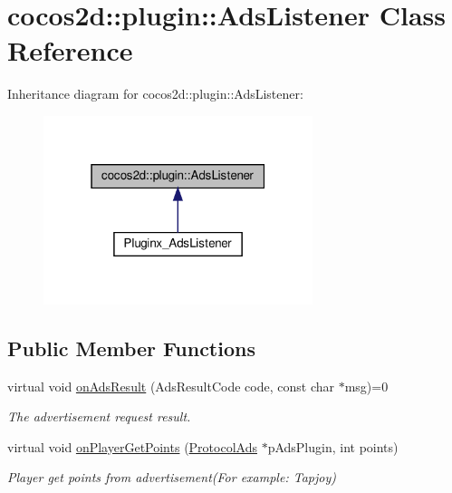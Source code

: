 \hypertarget{classcocos2d_1_1plugin_1_1AdsListener}{}\section{cocos2d\+:\+:plugin\+:\+:Ads\+Listener Class Reference}
\label{classcocos2d_1_1plugin_1_1AdsListener}


Inheritance diagram for cocos2d\+:\+:plugin\+:\+:Ads\+Listener\+:
\nopagebreak
\begin{figure}[H]
\begin{center}
\leavevmode
\includegraphics[width=223pt]{classcocos2d_1_1plugin_1_1AdsListener__inherit__graph}
\end{center}
\end{figure}
\subsection*{Public Member Functions}
\begin{DoxyCompactItemize}
\item 
\mbox{\label{classcocos2d_1_1plugin_1_1AdsListener_a4ca471cdad3ae855b6420e7b5c8e9c2f}} 
virtual void \hyperlink{classcocos2d_1_1plugin_1_1AdsListener_a4ca471cdad3ae855b6420e7b5c8e9c2f}{on\+Ads\+Result} (Ads\+Result\+Code code, const char $\ast$msg)=0
\begin{DoxyCompactList}\small\item\em The advertisement request result. \end{DoxyCompactList}\item 
virtual void \hyperlink{classcocos2d_1_1plugin_1_1AdsListener_a820961228a161de9f06cccabfd117d7c}{on\+Player\+Get\+Points} (\hyperlink{classcocos2d_1_1plugin_1_1ProtocolAds}{Protocol\+Ads} $\ast$p\+Ads\+Plugin, int points)
\begin{DoxyCompactList}\small\item\em Player get points from advertisement(\+For example\+: Tapjoy) \end{DoxyCompactList}\end{DoxyCompactItemize}


